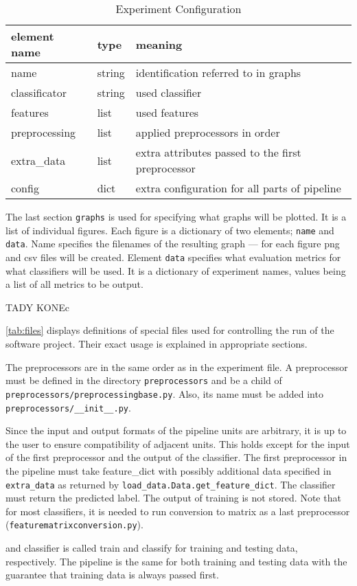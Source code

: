 \begin{table}[h]

\centering
\begin{tabular}{lll}
\toprule
\textbf{element name} & \textbf{type} & \textbf{meaning}\\
\midrule
name 			& string	& identification referred to in graphs\\
classificator 	& string	& used classifier\\
features 		& list		& used features \\
preprocessing 	& list		& applied preprocessors in order\\
extra\_data 	& list 		& extra attributes passed to the first preprocessor \\
config			& dict		& extra configuration for all parts of pipeline \\
\bottomrule
\end{tabular}

\caption{Experiment Configuration}\label{tab:exp_dict}
\end{table}


The last section \texttt{graphs} is used for specifying what graphs will be plotted.
It is a list of individual figures.
Each figure is a dictionary of two elements; \texttt{name} and \texttt{data}.
Name specifies the filenames of the resulting graph ---
for each figure png and csv files will be created.
Element \texttt{data} specifies what evaluation metrics for what classifiers will be used.
It is a dictionary of experiment names, values being a list of all metrics to be output.





TADY KONEc

\autoref{tab:files} displays definitions of special files used for controlling the run of the software project.
Their exact usage is explained in appropriate sections.

The preprocessors are in the same order as in the experiment file.
A preprocessor must be defined in the directory \texttt{preprocessors} and be a child of \texttt{preprocessors/preprocessingbase.py}.
Also, its name must be added into \texttt{preprocessors/\_\_init\_\_.py}.

Since the input and output formats of the pipeline units are arbitrary,
it is up to the user to ensure compatibility of adjacent units.
This holds except for the input of the first preprocessor and the output of the classifier.
The first preprocessor in the pipeline must take feature\_dict with possibly additional data specified in \texttt{extra\_data} as returned by \texttt{load\_data.Data.get\_feature\_dict}.
The classifier must return the predicted label.
The output of training is not stored.
Note that for most classifiers, it is needed to run conversion to matrix as a last preprocessor (\texttt{featurematrixconversion.py}).

and classifier is called train and classify for
training and testing data, respectively.
The pipeline is the same for both training and testing data with the guarantee that
training data is always passed first.
